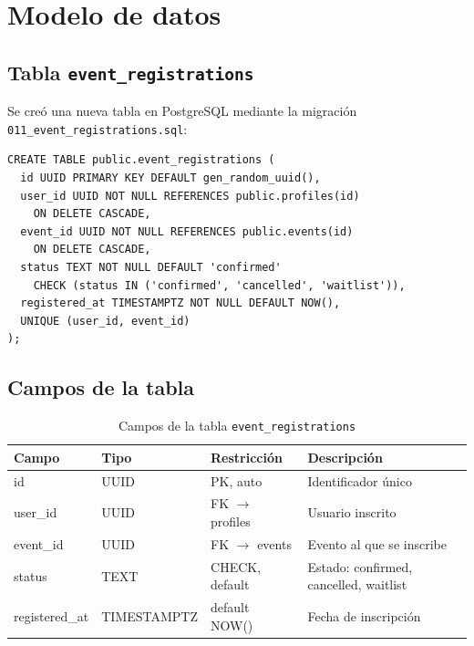 \documentclass[12pt,letterpaper]{article}
\begin{document}
\section{Modelo de datos}

\subsection{Tabla \texttt{event\_registrations}}

Se cre\'o una nueva tabla en PostgreSQL mediante la migraci\'on
\texttt{011\_event\_registrations.sql}:

\begin{verbatim}
CREATE TABLE public.event_registrations (
  id UUID PRIMARY KEY DEFAULT gen_random_uuid(),
  user_id UUID NOT NULL REFERENCES public.profiles(id)
    ON DELETE CASCADE,
  event_id UUID NOT NULL REFERENCES public.events(id)
    ON DELETE CASCADE,
  status TEXT NOT NULL DEFAULT 'confirmed'
    CHECK (status IN ('confirmed', 'cancelled', 'waitlist')),
  registered_at TIMESTAMPTZ NOT NULL DEFAULT NOW(),
  UNIQUE (user_id, event_id)
);
\end{verbatim}

\subsection{Campos de la tabla}

\begin{table}[H]
\centering
\begin{tabular}{@{}lllp{5cm}@{}}
\toprule
\textbf{Campo} & \textbf{Tipo} & \textbf{Restricci\'on} &
  \textbf{Descripci\'on} \\
\midrule
id & UUID & PK, auto & Identificador \'unico \\
user\_id & UUID & FK $\to$ profiles & Usuario inscrito \\
event\_id & UUID & FK $\to$ events & Evento al que se inscribe \\
status & TEXT & CHECK, default & Estado: confirmed, cancelled,
  waitlist \\
registered\_at & TIMESTAMPTZ & default NOW() & Fecha de inscripci\'on \\
\bottomrule
\end{tabular}
\caption{Campos de la tabla \texttt{event\_registrations}}
\end{table}
\end{document}
